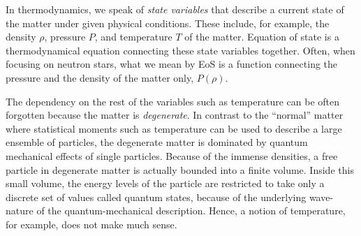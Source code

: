 

In thermodynamics, we speak of \emph{state variables} that describe a current state of the matter under given physical conditions.
These include, for example, the density $\rho$, pressure $P$, and temperature $T$ of the matter.
Equation of state is a thermodynamical equation connecting these state variables together.
Often, when focusing on neutron stars, what we mean by EoS is a function connecting the pressure and the density of the matter only, $P(\rho)$.

The dependency on the rest of the variables such as temperature can be often forgotten because the matter is \emph{degenerate}. %
In contrast to the ``normal'' matter where statistical moments such as temperature can be used to describe a large ensemble of particles, the degenerate matter is dominated by quantum mechanical effects of single particles.
Because of the immense densities, a free particle in degenerate matter is actually bounded into a finite volume.
Inside this small volume, the energy levels of the particle are restricted to take only a discrete set of values called quantum states, because of the underlying wave-nature of the quantum-mechanical description.
Hence, a notion of temperature, for example, does not make much sense.

